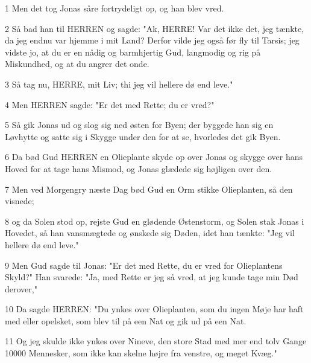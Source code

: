 \par 1 Men det tog Jonas såre fortrydeligt op, og han blev vred.
\par 2 Så bad han til HERREN og sagde: "Ak, HERRE! Var det ikke det, jeg tænkte, da jeg endnu var hjemme i mit Land? Derfor vilde jeg også før fly til Tarsis; jeg vidste jo, at du er en nådig og barmhjertig Gud, langmodig og rig på Miskundhed, og at du angrer det onde.
\par 3 Så tag nu, HERRE, mit Liv; thi jeg vil hellere dø end leve."
\par 4 Men HERREN sagde: "Er det med Rette; du er vred?"
\par 5 Så gik Jonas ud og slog sig ned østen for Byen; der byggede han sig en Løvhytte og satte sig i Skygge under den for at se, hvorledes det gik Byen.
\par 6 Da bød Gud HERREN en Olieplante skyde op over Jonas og skygge over hans Hoved for at tage hans Mismod, og Jonas glædede sig højligen over den.
\par 7 Men ved Morgengry næste Dag bød Gud en Orm stikke Olieplanten, så den visnede;
\par 8 og da Solen stod op, rejste Gud en glødende Østenstorm, og Solen stak Jonas i Hovedet, så han vansmægtede og ønskede sig Døden, idet han tænkte: "Jeg vil hellere dø end leve."
\par 9 Men Gud sagde til Jonas: "Er det med Rette, du er vred for Olieplantens Skyld?" Han svarede: "Ja, med Rette er jeg så vred, at jeg kunde tage min Død derover,"
\par 10 Da sagde HERREN: "Du ynkes over Olieplanten, som du ingen Møje har haft med eller opelsket, som blev til på een Nat og gik ud på een Nat.
\par 11 Og jeg skulde ikke ynkes over Nineve, den store Stad med mer end tolv Gange 10000 Mennesker, som ikke kan skelne højre fra venstre, og meget Kvæg."


